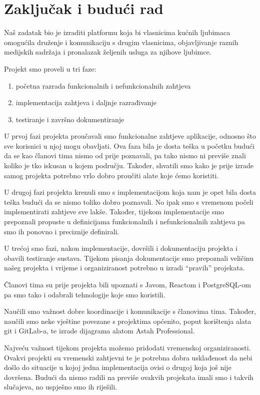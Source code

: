 \chapter{Zaključak i budući rad}
		
		Naš zadatak bio je izraditi platformu koja bi vlasnicima kućnih ljubimaca omogućila druženje i komunikaciju s drugim vlasnicima, objavljivanje raznih medijskih sadržaja i pronalazak željenih usluga za njihove ljubimce.
		
		Projekt smo proveli u tri faze:
		\begin{enumerate}
			\item početna razrada funkcionalnih i nefunkcionalnih zahtjeva
			\item implementacija zahtjeva i daljnje razrađivanje
			\item testiranje i završno dokumentiranje
		\end{enumerate} 
	
		U prvoj fazi projekta proučavali smo funkcionalne zahtjeve aplikacije, odnosno što sve korisnici u njoj mogu obavljati. Ova faza bila je dosta teška u početku budući da se kao članovi tima nismo od prije poznavali, pa tako nismo ni previše znali koliko je tko iskusan u kojem području. Također, shvatili smo kako je prije izrade samog projekta potrebno vrlo dobro proučiti alate koje ćemo koristiti. 
		
		U drugoj fazi projekta krenuli smo s implementacijom koja nam je opet bila dosta teška budući da se nismo toliko dobro poznavali. No ipak smo s vremenom počeli implementirati zahtjeve sve lakše. Također, tijekom implementacije smo prepoznali propuste u definicijama funkcionalnih i nefunkcionalnih zahtjeva pa smo ih ponovno i preciznije definirali. 
		
		U trećoj smo fazi, nakon implementacije, dovršili i dokumentaciju projekta i obavili testiranje sustava. Tijekom pisanja dokumentacije smo prepoznali veličinu našeg projekta i vrijeme i organiziranost potrebno u izradi “pravih” projekata. 
		
		Članovi tima su prije projekta bili upoznati s Javom, Reactom i PostgreSQL-om pa smo tako i odabrali tehnologije koje smo koristili. 
		
		Naučili smo važnost dobre koordinacije i komunikacije s članovima tima. Također, naučili smo neke vještine povezane s projektima općenito, poput korištenja alata git i GitLab-a, te izrade dijagrama alatom Astah Professional.
		
		Najveću važnost tijekom projekta možemo pridodati vremenskoj organiziranosti. Ovakvi projekti su vremenski zahtjevni te je potrebna dobra usklađenost da nebi došlo do situacije u kojoj jedna implementacija ovisi o drugoj koja još nije dovršena. Budući da nismo radili na previše ovakvih projekata imali smo i takvih slučajeva, no uspješno smo ih riješili. 
		

